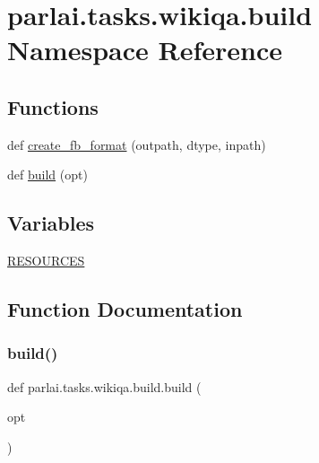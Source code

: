 \hypertarget{namespaceparlai_1_1tasks_1_1wikiqa_1_1build}{}\section{parlai.\+tasks.\+wikiqa.\+build Namespace Reference}
\label{namespaceparlai_1_1tasks_1_1wikiqa_1_1build}
\subsection*{Functions}
\begin{DoxyCompactItemize}
\item 
def \hyperlink{namespaceparlai_1_1tasks_1_1wikiqa_1_1build_a554828702769592403db58c955d1dfe3}{create\+\_\+fb\+\_\+format} (outpath, dtype, inpath)
\item 
def \hyperlink{namespaceparlai_1_1tasks_1_1wikiqa_1_1build_a76f8aa9733d147ed1b5f2ec73a2bde07}{build} (opt)
\end{DoxyCompactItemize}
\subsection*{Variables}
\begin{DoxyCompactItemize}
\item 
\hyperlink{namespaceparlai_1_1tasks_1_1wikiqa_1_1build_a5774588ffae31655f4f21a871e97ebdb}{R\+E\+S\+O\+U\+R\+C\+ES}
\end{DoxyCompactItemize}


\subsection{Function Documentation}
\mbox{\label{namespaceparlai_1_1tasks_1_1wikiqa_1_1build_a76f8aa9733d147ed1b5f2ec73a2bde07}} 
\subsubsection{\texorpdfstring{build()}{build()}}
{\footnotesize\ttfamily def parlai.\+tasks.\+wikiqa.\+build.\+build (\begin{DoxyParamCaption}\item[{}]{opt }\end{DoxyParamCaption})}



